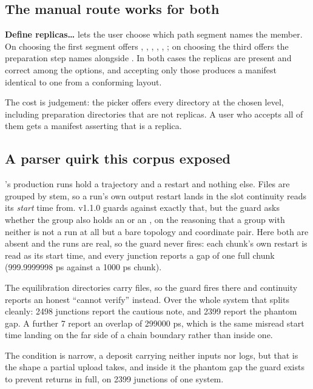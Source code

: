 \documentclass[11pt]{article}
\begin{document}
\subsection{The manual route works for both}

\textbf{Define replicas\ldots} lets the user choose which path segment names the member.
On  choosing the first segment offers
, , , , , ; on
 choosing the third offers the preparation step names alongside
. In both cases the replicas are present and correct among the options, and
accepting only those produces a manifest identical to one from a conforming layout.

The cost is judgement: the picker offers every directory at the chosen level, including
preparation directories that are not replicas. A user who accepts all of them gets a
manifest asserting that  is a replica.

\subsection{A parser quirk this corpus exposed}
\label{sec:quirk}

's production runs hold a trajectory and a restart and nothing else. Files
are grouped by stem, so a run's own output restart lands in the slot continuity reads its
\emph{start} time from. v1.1.0 guards against exactly that, but the guard asks whether the
group also holds an  or an , on the reasoning that a group with
neither is not a run at all but a bare topology and coordinate pair. Here both are absent
and the runs are real, so the guard never fires: each chunk's own restart is read as its
start time, and every junction reports a gap of one full chunk (999.9999998 ps against a
1000 ps chunk).

The equilibration directories carry  files, so the guard fires there and
continuity reports an honest ``cannot verify'' instead. Over the whole system that splits
cleanly: 2498 junctions report the cautious note, and 2399 report the phantom gap. A
further 7 report an overlap of 299000 ps, which is the same misread start time landing on
the far side of a chain boundary rather than inside one.

The condition is narrow, a deposit carrying neither inputs nor logs, but that is the shape
a partial upload takes, and inside it the phantom gap the guard exists to prevent returns
in full, on 2399 junctions of one system.
\end{document}
